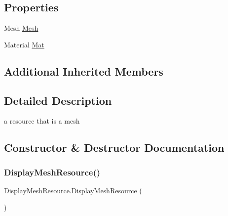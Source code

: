\subsection*{Properties}
\begin{DoxyCompactItemize}
\item 
Mesh \mbox{\hyperlink{class_display_mesh_resource_a3ea74e82fc6354c0d84ed87b996e64d9}{Mesh}}
\item 
Material \mbox{\hyperlink{class_display_mesh_resource_addb4fd55147fa231d6ea1acc8a7a6cf5}{Mat}}
\end{DoxyCompactItemize}
\subsection*{Additional Inherited Members}


\subsection{Detailed Description}
a resource that is a mesh 



\subsection{Constructor \& Destructor Documentation}
\mbox{\label{class_display_mesh_resource_ab51d570e0165de27fc603b69ae026e6b}} 
\subsubsection{\texorpdfstring{Display\+Mesh\+Resource()}{DisplayMeshResource()}\hspace{0.1cm}{\footnotesize\ttfamily [1/2]}}
{\footnotesize\ttfamily Display\+Mesh\+Resource.\+Display\+Mesh\+Resource (\begin{DoxyParamCaption}{ }\end{DoxyParamCaption})}

\mbox{\label{class_display_mesh_resource_aa4b6bc70724de2c056737f015cad4a41}} 
